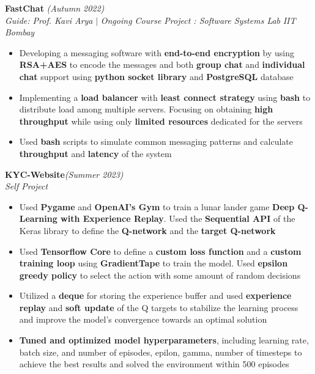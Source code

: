\documentclass[a4paper,10pt]{article}
\begin{document}
\vspace{\baselineskip}
\vspace{-15pt}
\noindent\textbf{\large FastChat} \hfill{\sl \small (Autumn 2022)}\\
{\it Guide: Prof. Kavi Arya} $|$ {\it Ongoing Course Project : Software Systems Lab } \hfill{\it IIT Bombay}\\
\vspace{-15pt}
\begin{itemize}[itemsep = -0.65 mm, leftmargin=*]
    \item Developing a messaging software with \textbf{end-to-end encryption} by using \textbf{RSA+AES} to encode the messages and both \textbf{group chat} and \textbf{individual chat} support using \textbf{python socket library} and \textbf{PostgreSQL} database
    \item Implementing a \textbf{load balancer} with \textbf{least connect strategy} using \textbf{bash} to distribute load among multiple servers. Focusing on obtaining \textbf{high throughput} while using only \textbf{limited resources} dedicated for the servers
    \item Used \textbf{bash} scripts to simulate common messaging patterns and calculate \textbf{throughput} and \textbf{latency} of the system
\end{itemize}
\vspace{\baselineskip}
\vspace{-15pt}
\noindent\textbf{\large KYC-Website}\hfill{\sl \small (Summer 2023)}\\
{\it Self Project}
\\\vspace{-15pt}
\begin{itemize}[itemsep = -0.65 mm, leftmargin=*]
    \item Used \textbf{Pygame} and \textbf{OpenAI's Gym} to train a lunar lander game \textbf{Deep Q-Learning with Experience Replay}. Used the \textbf{Sequential API} of the Keras library to define the \textbf{Q-network} and the \textbf{target Q-network}
    \item Used \textbf{Tensorflow Core} to define a \textbf{custom loss function} and a \textbf{custom training loop} using \textbf{GradientTape} to train the model. Used \textbf{epsilon greedy policy} to select the action with some amount of random decisions
    \item Utilized a \textbf{deque} for storing the experience buffer and used \textbf{experience replay} and \textbf{soft update} of the Q targets to stabilize the learning process and improve the model's convergence towards an optimal solution
    \item \textbf{Tuned and optimized model hyperparameters}, including learning rate, batch size, and number of episodes, epilon, gamma, number of timesteps to achieve the best results and solved the environment within 500 episodes
\end{itemize}
\end{document}
